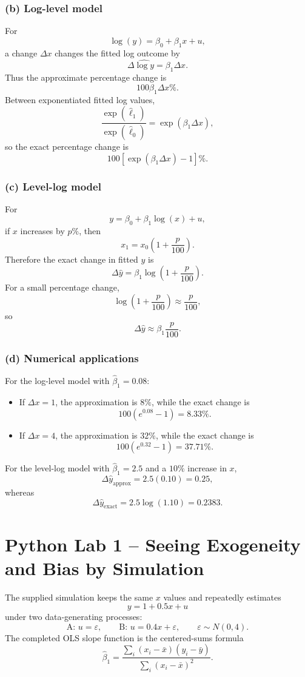 \documentclass[11pt,a4paper]{article}
\begin{document}
\subsubsection*{(b) Log-level model}
For
\[
 \log(y)=\beta_0+\beta_1x+u,
\]
a change $\Delta x$ changes the fitted log outcome by
\[
 \Delta\widehat{\log y}=\beta_1\Delta x.
\]
Thus the approximate percentage change is
\[
 \boxed{100\beta_1\Delta x\%}.
\]
Between exponentiated fitted log values,
\[
 \frac{\exp(\hat\ell_1)}{\exp(\hat\ell_0)}
 =\exp(\beta_1\Delta x),
\]
so the exact percentage change is
\[
 \boxed{100\left[\exp(\beta_1\Delta x)-1\right]\%}.
\]

\subsubsection*{(c) Level-log model}
For
\[
 y=\beta_0+\beta_1\log(x)+u,
\]
if $x$ increases by $p\%$, then
\[
 x_1=x_0\left(1+\frac{p}{100}\right).
\]
Therefore the exact change in fitted $y$ is
\[
 \boxed{
 \Delta\hat y
 =\beta_1\log\!\left(1+\frac{p}{100}\right)
 }.
\]
For a small percentage change,
\[
 \log\!\left(1+\frac{p}{100}\right)\approx\frac{p}{100},
\]
so
\[
 \boxed{\Delta\hat y\approx\beta_1\frac{p}{100}}.
\]

\subsubsection*{(d) Numerical applications}
For the log-level model with $\hat\beta_1=0.08$:
\begin{itemize}
 \item If $\Delta x=1$, the approximation is $8\%$, while the exact change is
 \[
 100(e^{0.08}-1)=\boxed{8.33\%}.
 \]
 \item If $\Delta x=4$, the approximation is $32\%$, while the exact change is
 \[
 100(e^{0.32}-1)=\boxed{37.71\%}.
 \]
\end{itemize}
For the level-log model with $\hat\beta_1=2.5$ and a $10\%$ increase in $x$,
\[
 \Delta\hat y_{\text{approx}}
 =2.5(0.10)=\boxed{0.25},
\]
whereas
\[
 \Delta\hat y_{\text{exact}}
 =2.5\log(1.10)
 =\boxed{0.2383}.
\]

\newpage
\section{Python Lab 1 -- Seeing Exogeneity and Bias by Simulation}
The supplied simulation keeps the same $x$ values and repeatedly estimates
\[
 y=1+0.5x+u
\]
under two data-generating processes:
\[
 \text{A: }u=\varepsilon,
 \qquad
 \text{B: }u=0.4x+\varepsilon,
 \qquad
 \varepsilon\sim N(0,4).
\]
The completed OLS slope function is the centered-sums formula
\[
 \hat\beta_1
 =\frac{\sum_i(x_i-\bar x)(y_i-\bar y)}
 {\sum_i(x_i-\bar x)^2}.
\]
\end{document}
